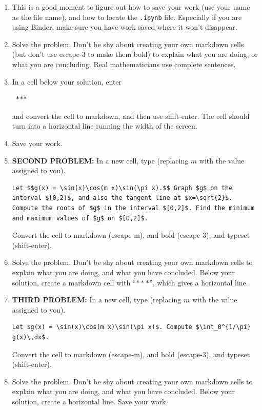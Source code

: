 \documentclass[12pt,answers]{book}
\begin{document}
\begin{enumerate}
  \item This is a good  moment to figure out how to save your work (use your name as the  file  name),  and how to locate the {\tt .ipynb} file. Especially if you are using Binder, make sure you have work saved where it won't disappear.

  \item Solve the problem. Don't be shy about creating your own markdown cells (but don't use escape-3 to make them bold) to explain what you are doing, or what you are concluding. Real mathematicians use complete sentences.

  \item In a cell below your solution, enter \begin{verbatim} *** \end{verbatim} and convert the cell to markdown, and then use shift-enter. The cell should turn into a horizontal line running the width of the screen.
  \item Save your work.
  \item {\bf SECOND PROBLEM:} In a new cell, type (replacing $m$ with the value assigned to you).
  \begin{lstlisting}[breaklines]
    Let $$g(x) = \sin(x)\cos(m x)\sin(\pi x).$$ Graph $g$ on the interval $[0,2]$, and also the tangent line at $x=\sqrt{2}$. Compute the roots of $g$ in the interval $[0,2]$. Find the minimum and maximum values of $g$ on $[0,2]$.
  \end{lstlisting}
  Convert the cell to markdown (escape-m), and bold (escape-3), and typeset (shift-enter).

  \item Solve the problem. Don't be shy about creating your own markdown cells to explain what you are doing, and what you have concluded. Below your solution, create a markdown cell with ``{$***$}'', which gives a horizontal line.

  \item {\bf THIRD PROBLEM:}  In a new cell, type (replacing $m$ with the value assigned to you).
  \begin{lstlisting}[breaklines]
    Let $g(x) = \sin(x)\cos(m x)\sin(\pi x)$. Compute $\int_0^{1/\pi} g(x)\,dx$.
  \end{lstlisting}
  Convert the cell to markdown (escape-m), and bold (escape-3), and typeset (shift-enter).

  \item Solve the problem. Don't be shy about creating your own markdown cells to explain what you are doing, and what you have concluded. Below your solution, create a horizontal line. Save your work.



\end{enumerate}
\end{document}
